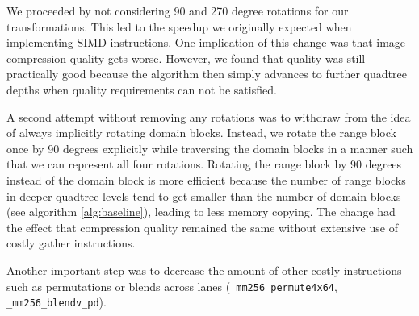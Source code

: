 We proceeded by not considering 90 and 270 degree rotations for our transformations.
This led to the speedup we originally expected when implementing SIMD instructions.
One implication of this change was that image compression quality gets worse. However, we found that quality
was still practically good because the algorithm then simply advances to further quadtree
depths when quality requirements can not be satisfied.

A second attempt without removing any rotations was to withdraw from the idea of
always implicitly rotating domain blocks. Instead, we rotate the range block
once by 90 degrees explicitly while traversing the domain blocks in a manner
such that we can represent all four rotations. Rotating the range block by 90
degrees instead of the domain block is more efficient because the number of range
blocks in deeper quadtree levels tend to get smaller than the number of domain
blocks (see algorithm \ref{alg:baseline}), leading to less memory copying. The
change had the effect that compression quality remained the same without
extensive use of costly gather instructions. 

Another important step was to decrease the amount of other costly instructions
such as permutations or blends across lanes (\verb|_mm256_permute4x64|,
\verb|_mm256_blendv_pd|).
